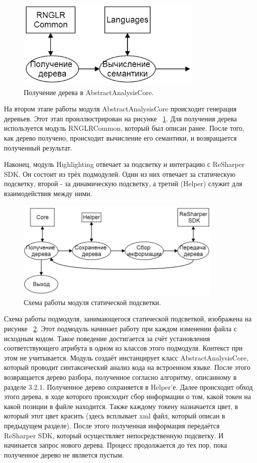\begin{figure}[h]
\centering
\includegraphics[width=90mm]{Pictures/Core_GetTree.png}
\caption{Получение дерева в AbstractAnalysisCore.}
\label{core_tree}
\end{figure}

На втором этапе работы модуля AbstractAnalysisCore происходит генерация деревьев. Этот этап проиллюстрирован на рисунке ~\ref{core_tree}. Для получения дерева используется модуль RNGLRCommon, который был описан ранее. После того, как дерево получено, происходит вычисление его семантики, и возвращается полученный результат. 

Наконец, модуль Highlighting отвечает за подсветку и интеграцию с ReSharper SDK. Он состоит из трёх подмодулей. Один из них отвечает за статическую подсветку, второй - за динамическую подсветку, а третий (Helper) служит для взаимодействия между ними. 

\begin{figure}[h]
\centering
\includegraphics[width=100mm]{Pictures/staticHighlighting.png}
\caption{Схема работы модуля статической подсветки.}
\label{staticHighlighting}
\end{figure}

Схема работы подмодуля, занимающегося статической подсветкой, изображена на рисунке ~\ref{staticHighlighting}. Этот подмодуль начинает работу при каждом изменении файла с исходным кодом. Такое поведение достигается за счёт установления соответствующего атрибута в одном из классов этого подмодуля. Контекст при этом не учитывается. Модуль создаёт инстанцирует класс AbstractAnalysisCore, который проводит синтаксический анализ кода на встроенном языке. После этого возвращается дерево разбора, полученное согласно алгоритму, описанному в разделе 3.2.1. Полученное дерево сохраняется в Helper’е. Далее происходит обход этого дерева, в ходе которого происходит сбор информации о том, какой токен на какой позиции в файле находится. Также каждому токену назначается цвет, в который этот цвет красить (здесь всплывает xml файл, который описан в предыдущем разделе). После этого полученная информация передаётся ReSharper SDK, который осуществляет непосредственную подсветку. И начинается запрос нового дерева. Процесс продолжается до тех пор, пока полученное дерево не является пустым.

